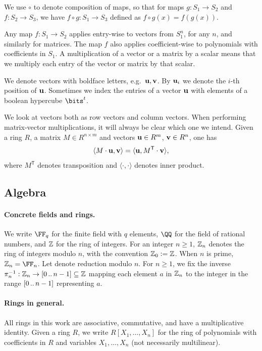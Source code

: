 We use $\circ$ to denote composition of maps, so that for maps $g: S_1\to S_2$ and $f:S_2\to S_3$, we have $f\circ g: S_1 \to S_3$ defined as $f\circ g(x) = f(g(x))$. 

Any map $f:S_1 \to S_2$ applies  entry-wise to vectors from $S_1^n$, for any $n$, and similarly for matrices. The map $f$ also applies coefficient-wise to polynomials with coefficients in $S_1$. A multiplication of a vector  or a matrix by a scalar means that we multiply each entry of the vector or matrix by that scalar. 

We denote vectors with boldface letters, e.g.\ $\mathbf{u},\mathbf{v}$. By $\mathbf{u}_i$ we denote the $i$-th position of $\mathbf{u}$. Sometimes we index the entries of a vector $\mathbf{u}$ with elements of a boolean hypercube $\bits^{t}$. 

We look at vectors both as row vectors and column vectors. When performing matrix-vector multiplications, it will always be clear which one we intend. Given a ring $R$, a  matrix $M\in R^{n\times m}$ and  vectors $\mathbf{u}\in R^m$, $\mathbf{v}\in R^n$, one has
%
\begin{equation}\label{e:matrix_transpose_inner_product}
\langle M\cdot \mathbf{u}, \mathbf{v} \rangle = \langle \mathbf{u}, M^{\mathsf{T}} \cdot \mathbf{v}\rangle,
\end{equation}
%
where $M^{\mathsf{T}}$ denotes transposition and $\langle \cdot, \cdot \rangle$ denotes inner product.

\subsection{Algebra}\label{s:prelims_algebra}
\paragraph{Concrete fields and rings.} We write $\FF_q$ for the finite field with $q$ elements, $\QQ$ for the field of rational numbers, and $\mathbb{Z}$ for the ring of integers. For an integer $n\geq 1$, $\mathbb{Z}_n$ denotes the ring of integers modulo $n$, with the convention $\mathbb{Z}_0{\;\vcentcolon=\;} \mathbb{Z}$. When $n$ is prime, $\ZZ_n=\FF_n$. Let  denote reduction modulo $n$. For $n\geq 1$, we fix the inverse $\pi_n^{-1} : \mathbb{Z}_n \to [0 \, .. \, n-1]\subseteq \mathbb{Z}$ mapping each element $a$ in $\mathbb{Z}_n$ to the integer in the range  $[0 \, .. \, n-1]$ representing $a$. 



\paragraph{Rings in general.} All rings in this work are associative, commutative, and have a multiplicative identity. Given a ring $R$, we write $R[X_1, \ldots, X_n]$ for the ring of polynomials with coefficients in $R$ and variables $X_1, \ldots, X_n$ (not necessarily multilinear). 

